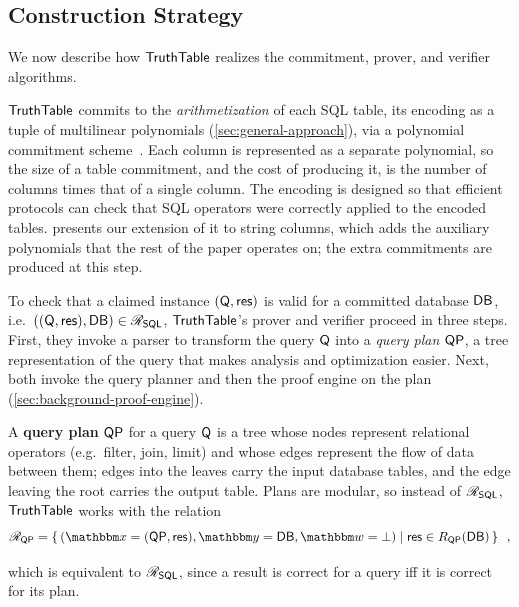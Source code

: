 \subsection{Construction Strategy}
\label{sec:background:construction-strategy}

We now describe how $\mathsf{TruthTable}$ realizes the commitment, prover, and verifier algorithms.

$\mathsf{TruthTable}$ commits to the \emph{arithmetization} of each SQL table, its encoding as a tuple of multilinear polynomials (\cref{sec:general-approach}), via a polynomial commitment scheme~\cite{KateZG10}.
Each column is represented as a separate polynomial, so the size of a table commitment, and the cost of producing it, is the number of columns times that of a single column.
The encoding is designed so that efficient protocols can check that SQL operators were correctly applied to the encoded tables.
 presents our extension of it to string columns, which adds the auxiliary polynomials that the rest of the paper operates on; the extra commitments are produced at this step.

To check that a claimed instance $(\mathsf{Q}, \mathsf{res})$ is valid for a committed database $\mathsf{DB}$, i.e.\ $((\mathsf{Q}, \mathsf{res}), \mathsf{DB}) \in \mathscr{R}_{\mathsf{SQL}}$, $\mathsf{TruthTable}$'s prover and verifier proceed in three steps.
First, they invoke a parser to transform the query $\mathsf{Q}$ into a \emph{query plan} $\mathsf{QP}$, a tree representation of the query that makes analysis and optimization easier.
Next, both invoke the query planner and then the proof engine on the plan (\cref{sec:background-proof-engine}).

A \textbf{query plan} $\mathsf{QP}$ for a query $\mathsf{Q}$ is a tree whose nodes represent relational operators (e.g.\ filter, join, limit) and whose edges represent the flow of data between them; edges into the leaves carry the input database tables, and the edge leaving the root carries the output table.
Plans are modular, so instead of $\mathscr{R}_{\mathsf{SQL}}$, $\mathsf{TruthTable}$ works with the relation
{\small
\begin{displaymath}
 \Relation{\QueryPlan} = \left\{\,
    (
        \NPInstance = (\QueryPlan, \QueryResult),
        \NPInstancey = \Database,
        \NPWitness = \bot
    )
  \;\middle|\;
  \QueryResult \in \ResultSet_\QueryPlan(\Database)
\,\right\}\enspace,
\end{displaymath}
}

\noindent
which is equivalent to $\mathscr{R}_{\mathsf{SQL}}$, since a result is correct for a query iff it is correct for its plan.

